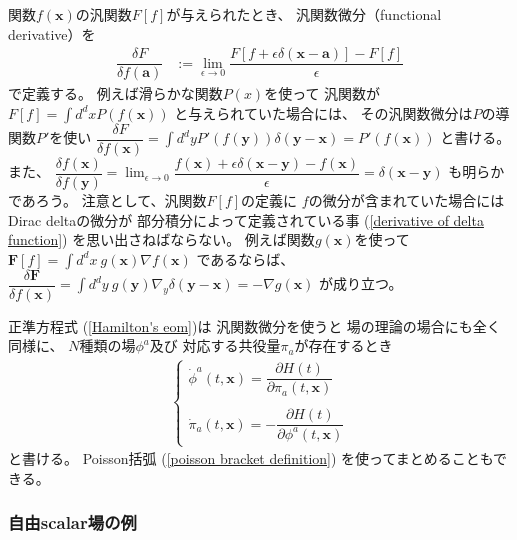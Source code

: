 関数$f(\bm{x})$の汎関数$F[f]$が与えられたとき、
汎関数微分（functional derivative）を
\begin{align}
    \dfrac{ \delta F }
        {\delta f(\bm{a})}
&:=
    \lim_{ \epsilon \to 0 }
    \dfrac{
        F[ f + \epsilon
            \delta(\bm{x} - \bm{a}) ]
    -
        F[ f ]
    }
        {\epsilon}
\end{align}
で定義する。
例えば滑らかな関数$P(x)$を使って
汎関数が
$\displaystyle
F[f] = \int d^d x P(f(\bm{x}))$
と与えられていた場合には、
その汎関数微分は$P$の導関数$P'$を使い
$\displaystyle
    \dfrac{\delta F}{\delta f(\bm{x})}
=
    \int d^d y
    P'( f(\bm{y}) )
    \delta(\bm{y} - \bm{x})
=
    P'( f(\bm{x}) )$
と書ける。
また、
$\displaystyle
\dfrac{\delta f(\bm{x})}
    {\delta f(\bm{y})}
= \lim_{\epsilon \to 0}
\dfrac{
    f(\bm{x})
    + \epsilon \delta(\bm{x} - \bm{y})
    - f(\bm{x})
}{\epsilon}
= \delta(\bm{x} - \bm{y})$
も明らかであろう。
注意として、汎関数$F[f]$の定義に
$f$の微分が含まれていた場合には
Dirac deltaの微分が
部分積分によって定義されている事
(\ref{derivative of delta function})
を思い出さねばならない。
例えば関数$g(\bm{x})$を使って
$\displaystyle
\bm{F}[f] = \int d^d x\ 
    g(\bm{x}) \nabla f(\bm{x})$
であるならば、
$\displaystyle
\dfrac{ \delta \bm{F} }
    {\delta f(\bm{x})}
= \int d^d y\ 
g(\bm{y}) \nabla_y
    \delta(\bm{y} - \bm{x})
= - \nabla g(\bm{x})$
が成り立つ。

正準方程式
(\ref{Hamilton's eom})は
汎関数微分を使うと
場の理論の場合にも全く同様に、
$N$種類の場$\phi^a$及び
対応する共役量$\pi_a$が存在するとき
\begin{align}
    \begin{cases}
        \dot{\phi}^a (t, \bm{x}) =
        \dfrac{\partial H (t)}
            {\partial \pi_a (t, \bm{x})}
      \\
      \\
        \dot{\pi}_a (t, \bm{x}) =
        - \dfrac{\partial H (t)}
            {\partial \phi^a(t, \bm{x})}
      \end{cases}
    \label{hamilton eom for fields}    
\end{align}
と書ける。
Poisson括弧
(\ref{poisson bracket definition})
を使ってまとめることもできる。

\subsubsection{自由scalar場の例}

